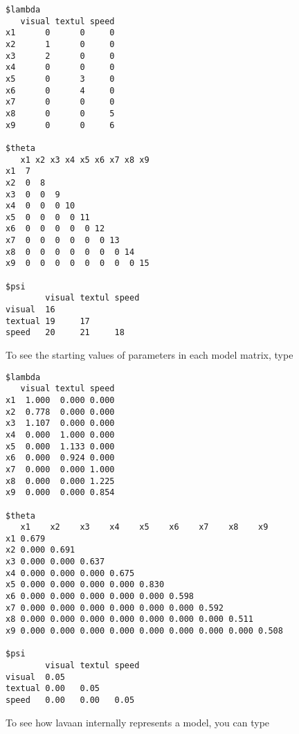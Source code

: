 \begin{verbatim}
$lambda
   visual textul speed
x1      0      0     0
x2      1      0     0
x3      2      0     0
x4      0      0     0
x5      0      3     0
x6      0      4     0
x7      0      0     0
x8      0      0     5
x9      0      0     6

$theta
   x1 x2 x3 x4 x5 x6 x7 x8 x9
x1  7                        
x2  0  8                     
x3  0  0  9                  
x4  0  0  0 10               
x5  0  0  0  0 11            
x6  0  0  0  0  0 12         
x7  0  0  0  0  0  0 13      
x8  0  0  0  0  0  0  0 14   
x9  0  0  0  0  0  0  0  0 15

$psi
        visual textul speed
visual  16                 
textual 19     17          
speed   20     21     18   
\end{verbatim}

To see the starting values of parameters in each model matrix, type

\begin{Shaded}
\begin{Highlighting}[]
 \NormalTok{)}
\end{Highlighting}
\end{Shaded}

\begin{verbatim}
$lambda
   visual textul speed
x1  1.000  0.000 0.000
x2  0.778  0.000 0.000
x3  1.107  0.000 0.000
x4  0.000  1.000 0.000
x5  0.000  1.133 0.000
x6  0.000  0.924 0.000
x7  0.000  0.000 1.000
x8  0.000  0.000 1.225
x9  0.000  0.000 0.854

$theta
   x1    x2    x3    x4    x5    x6    x7    x8    x9   
x1 0.679                                                
x2 0.000 0.691                                          
x3 0.000 0.000 0.637                                    
x4 0.000 0.000 0.000 0.675                              
x5 0.000 0.000 0.000 0.000 0.830                        
x6 0.000 0.000 0.000 0.000 0.000 0.598                  
x7 0.000 0.000 0.000 0.000 0.000 0.000 0.592            
x8 0.000 0.000 0.000 0.000 0.000 0.000 0.000 0.511      
x9 0.000 0.000 0.000 0.000 0.000 0.000 0.000 0.000 0.508

$psi
        visual textul speed
visual  0.05               
textual 0.00   0.05        
speed   0.00   0.00   0.05 
\end{verbatim}

To see how lavaan internally represents a model, you can type


